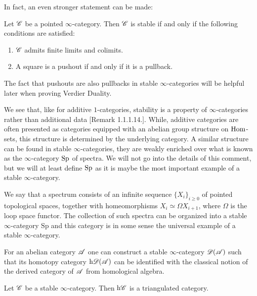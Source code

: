 \documentclass[../../thesis.tex]{subfiles}
\begin{document}
In fact, an even stronger statement can be made:
\begin{proposition}
    Let $\mathscr{C}$ be a pointed $\infty$-category.
    Then $\mathscr{C}$ is stable if and only if the following conditions are satisfied:
    \begin{enumerate}
        \item $\mathscr{C}$ admits finite limits and colimits.
        \item A square is a pushout if and only if it is a pullback.
    \end{enumerate}
\end{proposition}
The fact that pushouts are also pullbacks in stable $\infty$-categories will be helpful later when proving Verdier Duality.


We see that, like for additive $1$-categories, stability is a property of $\infty$-categories rather than additional data \cite{HA}[Remark 1.1.1.14.].
While, additive categories are often presented as categories equipped with an abelian group structure on $\mathrm{Hom}$-sets, this structure is determined by the underlying category.
A similar structure can be found in stable $\infty$-categories, they are weakly enriched over what is known as the $\infty$-category $\mathrm{Sp}$ of spectra.
We will not go into the details of this comment, but we will at least define $\mathrm{Sp}$ as it is maybe the most important example of a stable $\infty$-category.
\begin{example}[{\cite{HA}[Example 1.1.1.11.]}]
    We say that a spectrum consists of an infinite sequence $\{X_i\}_{i \geq 0}$ of pointed topological spaces, together with homeomorphisms $X_i \simeq \Omega X_{i+1}$, where $\Omega$ is the loop space functor.
    The collection of such spectra can be organized into a stable $\infty$-category $\mathrm{Sp}$ and this category is in some sense the universal example of a stable $\infty$-category.
\end{example}
\begin{example}[{\cite{HA}[Example 1.1.1.12.]}]
    For an abelian category $\mathscr{A}$ one can construct a stable $\infty$-category $\mathscr{D}(\mathscr{A})$ such that its homotopy category $\mathrm{h}\mathscr{D}(\mathscr{A})$ can be identified with the classical notion of the derived category of $\mathscr{A}$ from homological algebra.
\end{example}
\begin{theorem}[{\cite{HA}[Theorem 1.1.2.14.]}]
    Let $\mathscr{C}$ be a stable $\infty$-category.
    Then $\mathrm{h}\mathscr{C}$ is a triangulated category.
\end{theorem}
\end{document}
